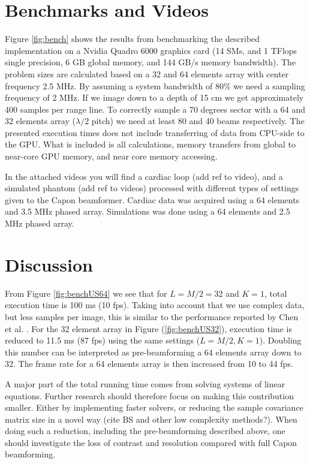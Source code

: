 \documentclass[conference]{IEEEtran}
\begin{document}
\section{Benchmarks and Videos}
Figure \ref{fig:bench} shows the results from benchmarking the described implementation on a Nvidia Quadro 6000 graphics card (14 SMs, and 1 TFlops single precision, 6 GB global memory, and 144 GB/s memory bandwidth). The problem sizes are calculated based on a 32 and 64 elements array with center frequency 2.5 MHz. By assuming a system bandwidth of 80\% we need a sampling frequency of 2 MHz. If we image down to a depth of 15 cm we get approximately 400 samples per range line. To correctly sample a 70 degrees sector with a 64 and 32 elements array ($\lambda/2$ pitch) we need at least 80 and 40 beams respectively. The presented execution times does not include transferring of data from CPU-side to the GPU. What is included is all calculations, memory transfers from global to near-core GPU memory, and near core memory accessing. 

In the attached videos you will find a cardiac loop (add ref to video), and a simulated phantom (add ref to videos) processed with different types of settings given to the Capon beamformer. Cardiac data was acquired using a 64 elements and 3.5 MHz phased array. Simulations was done using a 64 elements and 2.5 MHz phased array. 

\section{Discussion}
From Figure \ref{fig:benchUS64} we see that for $L = M/2 = 32$ and $K=1$, total execution time is 100 ms (10 fps). Taking into account that we use complex data, but less samples per image, this is similar to the performance reported by Chen et al. \cite{Chen2011}. For the 32 element array in Figure (\ref{fig:benchUS32}), execution time is reduced to 11.5 ms (87 fps) using the same settings ($L=M/2, K = 1$). Doubling this number can be interpreted as pre-beamforming a 64 elements array down to 32. The frame rate for a 64 elements array is then increased from 10 to 44 fps.

A major part of the total running time comes from solving systems of linear equations. Further research should therefore focus on making this contribution smaller. Either by implementing faster solvers, or reducing the sample covariance matrix size in a novel way (cite BS and other low complexity methods?). When doing such a reduction, including the pre-beamforming described above, one should investigate the loss of contrast and resolution compared with full Capon beamforming.
\end{document}
